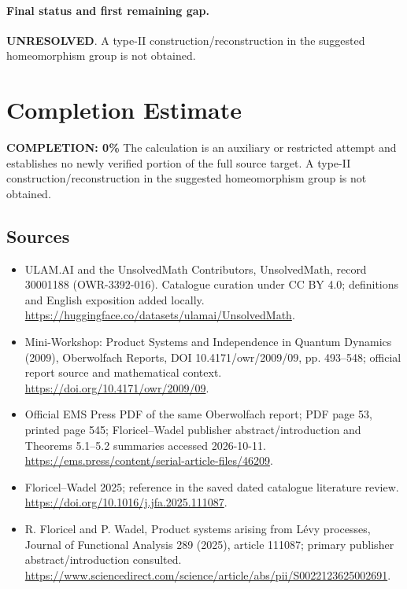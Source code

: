 \documentclass[11pt]{article}
\begin{document}
\paragraph{Final status and first remaining gap.}
\textbf{UNRESOLVED}. A type-II construction/reconstruction in the suggested homeomorphism group is not obtained.

\section{Completion Estimate}
\noindent\textbf{COMPLETION: 0\%}
The calculation is an auxiliary or restricted attempt and establishes no newly verified portion of the full source target. A type-II construction/reconstruction in the suggested homeomorphism group is not obtained.

\subsection{Sources}
\begin{itemize}
\item[\hypertarget{source:30001188:1}{S1}] ULAM.AI and the UnsolvedMath Contributors, UnsolvedMath, record 30001188 (OWR-3392-016). Catalogue curation under CC BY 4.0; definitions and English exposition added locally.
\url{https://huggingface.co/datasets/ulamai/UnsolvedMath}.
\item[\hypertarget{source:30001188:2}{S2}] Mini-Workshop: Product Systems and Independence in Quantum Dynamics (2009), Oberwolfach Reports, DOI 10.4171/owr/2009/09, pp. 493--548; official report source and mathematical context.
\url{https://doi.org/10.4171/owr/2009/09}.
\item[\hypertarget{source:30001188:3}{S3}] Official EMS Press PDF of the same Oberwolfach report; PDF page 53, printed page 545; Floricel--Wadel publisher abstract/introduction and Theorems 5.1--5.2 summaries accessed 2026-10-11.
\url{https://ems.press/content/serial-article-files/46209}.
\item[\hypertarget{source:30001188:4}{S4}] Floricel--Wadel 2025; reference in the saved dated catalogue literature review.
\url{https://doi.org/10.1016/j.jfa.2025.111087}.
\item[\hypertarget{source:30001188:5}{S5}] R. Floricel and P. Wadel, Product systems arising from Lévy processes, Journal of Functional Analysis 289 (2025), article 111087; primary publisher abstract/introduction consulted.
\url{https://www.sciencedirect.com/science/article/abs/pii/S0022123625002691}.
\end{itemize}
\label{end:30001188}
\end{document}
